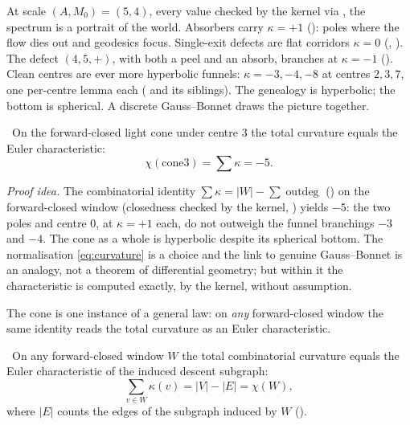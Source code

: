 At scale $(A, M_0) = (5, 4)$, every value checked by the kernel via , the spectrum is a
portrait of the world. Absorbers carry $\kappa = +1$ (): poles where the
flow dies out and geodesics focus. Single-exit defects are flat corridors $\kappa = 0$
(, ). The defect $(4,5,+)$, with both a
peel and an absorb, branches at $\kappa = -1$ (). Clean centres are
ever more hyperbolic funnels: $\kappa = -3, -4, -8$ at centres $2, 3, 7$, one per-centre lemma each
( and its siblings). The genealogy is hyperbolic; the bottom is
spherical. A discrete Gauss--Bonnet draws the picture together.

\begin{theorem}\label{thm:gaussBonnet_cone3}
\green{}\ On the forward-closed light cone under centre $3$ the total curvature equals the Euler
characteristic:
\begin{equation}\label{eq:gaussBonnet}
\chi(\mathrm{cone3}) = \textstyle\sum \kappa = -5.
\end{equation}
\end{theorem}

\emph{Proof idea.} The combinatorial identity $\sum\kappa = |W| - \sum\operatorname{outdeg}$
() on the forward-closed window  (closedness checked by the
kernel, ) yields $-5$: the two poles and centre $0$, at $\kappa = +1$
each, do not outweigh the funnel branchings $-3$ and $-4$. The cone as a whole is hyperbolic despite
its spherical bottom. The normalisation \cref{eq:curvature} is a choice and the link to genuine
Gauss--Bonnet is an analogy, not a theorem of differential geometry; but within it the characteristic
is computed exactly, by the kernel, without assumption.

The cone is one instance of a general law: on \emph{any} forward-closed window the same identity reads
the total curvature as an Euler characteristic.

\begin{theorem}\label{thm:gaussBonnet_eq_euler}
\green{}\ On any forward-closed window $W$ the total combinatorial curvature equals the Euler
characteristic of the induced descent subgraph:
\begin{equation}\label{eq:gaussBonnetEuler}
\textstyle\sum_{v\in W} \kappa(v) = |V| - |E| = \chi(W),
\end{equation}
where $|E|$ counts the edges of the subgraph induced by $W$ ().
\end{theorem}


